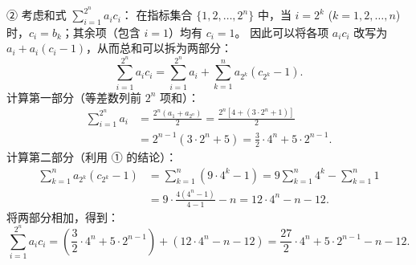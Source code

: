 \begin{answer}
② 考虑和式 $\sum_{i=1}^{2^n} a_i c_i$：
在指标集合 $\{1, 2, \dots, 2^n\}$ 中，当 $i = 2^k$ ($k = 1, 2, \dots, n$) 时，$c_i = b_k$；其余项（包含 $i=1$）均有 $c_i = 1$。
因此可以将各项 $a_i c_i$ 改写为 $a_i + a_i(c_i - 1)$，从而总和可以拆为两部分：
\nopagebreak[4]
\[\sum_{i=1}^{2^n} a_i c_i = \sum_{i=1}^{2^n} a_i + \sum_{k=1}^n a_{2^k}(c_{2^k} - 1).\]
计算第一部分（等差数列前 $2^n$ 项和）：
\nopagebreak[4]
\[\begin{aligned}
\sum_{i=1}^{2^n} a_i &= \frac{2^n (a_1 + a_{2^n})}{2} = \frac{2^n [4 + (3 \cdot 2^n + 1)]}{2} \\
&= 2^{n-1}(3 \cdot 2^n + 5) = \frac{3}{2} \cdot 4^n + 5 \cdot 2^{n-1}.
\end{aligned}\]
计算第二部分（利用 ① 的结论）：
\nopagebreak[4]
\[\begin{aligned}
\sum_{k=1}^n a_{2^k}(c_{2^k} - 1) &= \sum_{k=1}^n (9 \cdot 4^k - 1) = 9 \sum_{k=1}^n 4^k - \sum_{k=1}^n 1 \\
&= 9 \cdot \frac{4(4^n - 1)}{4 - 1} - n = 12 \cdot 4^n - n - 12.
\end{aligned}\]
将两部分相加，得到：
\nopagebreak[4]
\[\sum_{i=1}^{2^n} a_i c_i = \left(\frac{3}{2} \cdot 4^n + 5 \cdot 2^{n-1}\right) + (12 \cdot 4^n - n - 12) = \frac{27}{2} \cdot 4^n + 5 \cdot 2^{n-1} - n - 12.\]



\end{answer}
